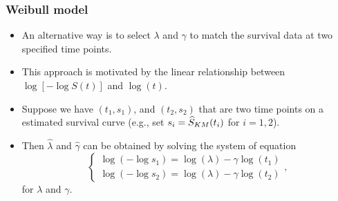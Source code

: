 \documentclass[10pt]{beamer}\usepackage[]{graphicx}\usepackage[]{color}
\newcommand{\Skm}{\widehat{S}_{\scriptsize{KM}}}
\begin{document}
\begin{frame}
  \frametitle{Weibull model}
  \begin{itemize}    
  \item An alternative way is to select $\lambda$ and $\gamma$ to match the
    survival data at two specified time points.
  \item This approach is motivated by the linear relationship between $\log\left[-\log S(t)\right]$
    and $\log(t)$.
  \item Suppose we have $(t_1, s_1)$, and $(t_2, s_2)$ that are two time points on 
    a estimated survival curve (e.g., set $s_i = \Skm(t_i)$ for $i = 1, 2$).
  \item Then $\hat\lambda$ and $\hat\gamma$ can be obtained by solving the system of equation
    $$ \left\{\begin{matrix}
\log\left(-\log s_1\right) = \log(\lambda) - \gamma\log(t_1) \\ 
\log\left(-\log s_2\right) = \log(\lambda) - \gamma\log(t_2)
\end{matrix}\right.,$$
    for $\lambda$ and $\gamma$.
  \end{itemize}  
\end{frame}
\end{document}
